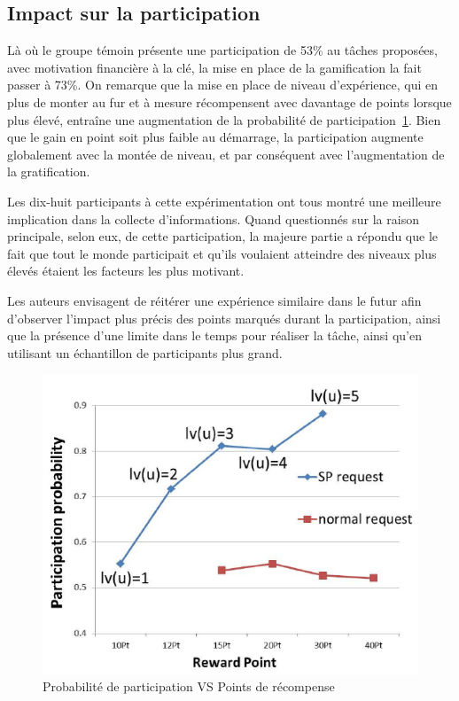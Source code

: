 \subsection{Impact sur la participation}
Là où le groupe témoin présente une participation de 53\% au tâches proposées, avec motivation financière à la clé, la mise en place de la gamification la fait passer à 73\%. On remarque que la mise en place de niveau d'expérience, qui en plus de monter au fur et à mesure récompensent avec davantage de points lorsque plus élevé, entraîne une augmentation de la probabilité de participation~\ref{fig:rewards}. Bien que le gain en point soit plus faible au démarrage, la participation augmente globalement avec la montée de niveau, et par conséquent avec l'augmentation de la gratification. \par
Les dix-huit participants à cette expérimentation ont tous montré une meilleure implication dans la collecte d'informations. Quand questionnés sur la raison principale, selon eux, de cette participation, la majeure partie a répondu que le fait que tout le monde participait et qu'ils voulaient atteindre des niveaux plus élevés étaient les facteurs les plus motivant. \par
Les auteurs envisagent de réitérer une expérience similaire dans le futur afin d'observer l'impact plus précis des points marqués durant la participation, ainsi que la présence d'une limite dans le temps pour réaliser la tâche, ainsi qu'en utilisant un échantillon de participants plus grand.


\begin{figure}
    \centering
    \includegraphics[width=0.7\linewidth]{Images/sensing-participation-figure.png}
    \caption{Probabilité de participation VS Points de récompense}
    \label{fig:rewards}
\end{figure}

